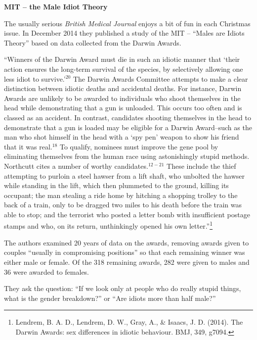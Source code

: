 \def\theTopic{Reading 7}


\begin{center}
{\bf {\large MIT -- the Male Idiot Theory}}
\end{center}


The usually  serious {\em British Medical Journal} enjoys a bit
of fun in each Christmas issue.  In December 2014 they
published a study of the MIT -- ``Males are Idiots Theory'' based on
data collected from the Darwin Awards.

``Winners of the Darwin Award must die in such an idiotic
manner that `their action ensures the long-term survival of the
species, by selectively allowing one less idiot to survive.'$^{20}$ The
Darwin Awards Committee attempts to make a clear distinction
between idiotic deaths and accidental deaths. For instance,
Darwin Awards are unlikely to be awarded to individuals who
shoot themselves in the head while demonstrating that a gun is
unloaded. This occurs too often and is classed as an accident.
In contrast, candidates shooting themselves in the head to
demonstrate that a gun is loaded may be eligible for a Darwin
Award--such as the man who shot himself in the head with a
`spy pen' weapon to show his friend that it was real.$^{18}$
To qualify, nominees must improve the gene pool by eliminating
themselves from the human race using astonishingly stupid
methods. Northcutt cites a number of worthy candidates.$^{12-21}$
These include the thief attempting to purloin a steel hawser from
a lift shaft, who unbolted the hawser while standing in the lift,
which then plummeted to the ground, killing its occupant; the
man stealing a ride home by hitching a shopping trolley to the
back of a train, only to be dragged two miles to his death before
the train was able to stop; and the terrorist who posted a letter
bomb with insufficient postage stamps and who, on its return,
unthinkingly opened his own letter.''\footnote{Lendrem, B. A. D.,
  Lendrem, D. W., Gray, A., \& Isaacs, J. D. (2014). The Darwin
  Awards: sex differences in idiotic behaviour. BMJ, 349, g7094.} 

The authors examined 20 years of data on the awards, removing awards
given to couples ``usually in compromising positions'' so that each
remaining winner was either male or female. Of the 318 remaining
awards, 282 were given to males and 36 were awarded to females.

They ask the question: ``If we look only at  people who do really
stupid things, what is the gender breakdown?''  or ``Are idiots more
than half male?''

